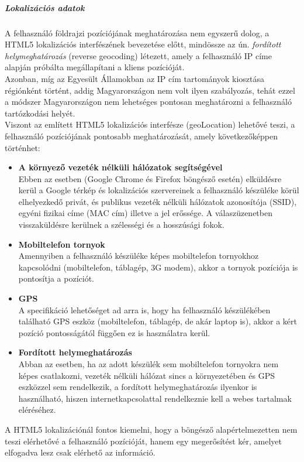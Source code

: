 \subparagraph{Lokalizációs adatok} %
\label{subp:lokalizációs_adatok}
A felhasználó földrajzi pozíciójának meghatározása nem egyszerű dolog, a HTML5 lokalizációs interfészének bevezetése előtt, mindössze az ún. \textit{fordított helymeghatározás} (reverse geocoding) létezett, amely a felhasználó IP címe alapján próbálta megállapítani a kliens pozícióját.\hfill\\
Azonban, míg az Egyesült Államokban az IP cím tartományok kiosztása régiónként történt, addig Magyarországon nem volt ilyen szabályozás, tehát ezzel a módszer Magyarországon nem lehetséges pontosan meghatározni a felhasználó tartózkodási helyét.\hfill\\
Viszont az említett HTML5 lokalizációs interfésze (geoLocation) lehetővé teszi, a felhasználó pozíciójának pontosabb meghatározását, amely következőképpen történhet:
\begin{itemize}
	\item{\textbf{A környező vezeték nélküli hálózatok segítségével}}\hfill\\
		Ebben az esetben (Google Chrome és Firefox böngésző esetén) elküldésre kerül a Google térkép és lokalizációs szervereinek a felhasználó készüléke körül elhelyezkedő privát, és publikus vezeték nélküli hálózatok azonosítója (SSID), egyéni fizikai címe (MAC cím) illetve a jel erőssége. A válaszüzenetben visszaküldésre kerülnek a szélességi és a hosszúsági fokok.
	\item{\textbf{Mobiltelefon tornyok}}\hfill\\
		Amennyiben a felhasználó készüléke képes mobiltelefon tornyokhoz kapcsolódni (mobiltelefon, táblagép, 3G modem), akkor a tornyok pozíciója is pontosítja a pozíciót.
	\item{\textbf{GPS}}\hfill\\
		A specifikáció lehetőséget ad arra is, hogy ha felhasználó készülékében található GPS eszköz (mobiltelefon, táblagép, de akár laptop is), akkor a kért pozíció pontosságától függően ez is használatra kerül.
	\item{\textbf{Fordított helymeghatározás}}\hfill\\
		Abban az esetben, ha az adott készülék sem mobiltelefon tornyokra nem képes csatlakozni, vezeték nélküli hálózat sincs a környezetében és GPS eszközzel sem rendelkezik, a fordított helymeghatározás ilyenkor is használható, hiszen internetkapcsolattal rendelkeznie kell a webes tartalmak eléréséhez.
\end{itemize}

A HTML5 lokalizációnál fontos kiemelni, hogy a böngésző alapértelmezetten nem teszi elérhetővé a felhasználó pozícióját, hanem egy megerősítést kér, amelyet elfogadva lesz csak elérhető az információ.

